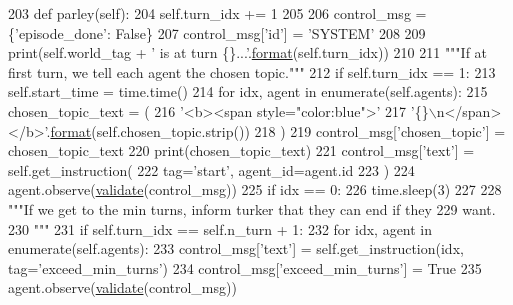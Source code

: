 \begin{DoxyCode}
203     \textcolor{keyword}{def }parley(self):
204         self.turn\_idx += 1
205 
206         control\_msg = \{\textcolor{stringliteral}{'episode\_done'}: \textcolor{keyword}{False}\}
207         control\_msg[\textcolor{stringliteral}{'id'}] = \textcolor{stringliteral}{'SYSTEM'}
208 
209         print(self.world\_tag + \textcolor{stringliteral}{' is at turn \{\}...'}.\hyperlink{namespaceparlai_1_1chat__service_1_1services_1_1messenger_1_1shared__utils_a32e2e2022b824fbaf80c747160b52a76}{format}(self.turn\_idx))
210 
211         \textcolor{stringliteral}{"""If at first turn, we tell each agent the chosen topic."""}
212         \textcolor{keywordflow}{if} self.turn\_idx == 1:
213             self.start\_time = time.time()
214             \textcolor{keywordflow}{for} idx, agent \textcolor{keywordflow}{in} enumerate(self.agents):
215                 chosen\_topic\_text = (
216                     \textcolor{stringliteral}{'<b><span style="color:blue">'}
217                     \textcolor{stringliteral}{'\{\}\(\backslash\)n</span></b>'}.\hyperlink{namespaceparlai_1_1chat__service_1_1services_1_1messenger_1_1shared__utils_a32e2e2022b824fbaf80c747160b52a76}{format}(self.chosen\_topic.strip())
218                 )
219                 control\_msg[\textcolor{stringliteral}{'chosen\_topic'}] = chosen\_topic\_text
220                 print(chosen\_topic\_text)
221                 control\_msg[\textcolor{stringliteral}{'text'}] = self.get\_instruction(
222                     tag=\textcolor{stringliteral}{'start'}, agent\_id=agent.id
223                 )
224                 agent.observe(\hyperlink{namespaceparlai_1_1core_1_1worlds_afc3fad603b7bce41dbdc9cdc04a9c794}{validate}(control\_msg))
225                 \textcolor{keywordflow}{if} idx == 0:
226                     time.sleep(3)
227 
228         \textcolor{stringliteral}{"""If we get to the min turns, inform turker that they can end if they}
229 \textcolor{stringliteral}{        want.}
230 \textcolor{stringliteral}{        """}
231         \textcolor{keywordflow}{if} self.turn\_idx == self.n\_turn + 1:
232             \textcolor{keywordflow}{for} idx, agent \textcolor{keywordflow}{in} enumerate(self.agents):
233                 control\_msg[\textcolor{stringliteral}{'text'}] = self.get\_instruction(idx, tag=\textcolor{stringliteral}{'exceed\_min\_turns'})
234                 control\_msg[\textcolor{stringliteral}{'exceed\_min\_turns'}] = \textcolor{keyword}{True}
235                 agent.observe(\hyperlink{namespaceparlai_1_1core_1_1worlds_afc3fad603b7bce41dbdc9cdc04a9c794}{validate}(control\_msg))

\end{DoxyCode}
